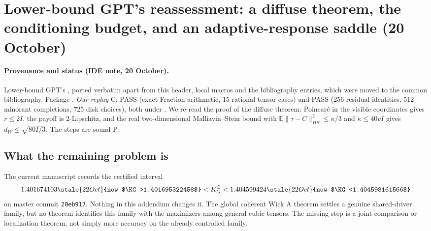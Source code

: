 \section{Lower-bound GPT's reassessment: a diffuse theorem, the conditioning budget, and an adaptive-response saddle (20 October)}\label{ch:gpt-forest}

\paragraph{Provenance and status (IDE note, 20 October).} Lower-bound GPT's , ported verbatim apart from this header, local macros and the bibliography
entries, which were moved to the common bibliography. Package . \emph{Our replay} \st{C}:  PASS
(exact Fraction arithmetic, 15 rational tensor cases) and  PASS (256 residual identities, 512 minorant completions, 725 disk choices), both under
. We re-read the proof of the diffuse theorem: Poincaré in the visible coordinates gives $r\le2I$, the payoff is $2$-Lipschitz, and the real two-dimensional
Malliavin--Stein bound with $\mathbb E\|\tau-C\|_{HS}^2\le\kappa/3$ and $\kappa\le40vI$ gives $d_W\le\sqrt{80I/3}$. The steps are sound \st{P}.
\providecommand{\EE}{\mathbb E}\providecommand{\CC}{\mathbb C}\providecommand{\RR}{\mathbb R}\providecommand{\HH}{\mathcal H}
\providecommand{\Rea}{\operatorname{Re}}\providecommand{\Ima}{\operatorname{Im}}\providecommand{\Var}{\operatorname{Var}}
\providecommand{\tr}{\operatorname{tr}}\providecommand{\phase}{\operatorname{phase}}\providecommand{\eps}{\varepsilon}

\subsection{What the remaining problem is}

The current manuscript records the certified interval
\[
1.401674103\stale{22 Oct}{now $\KG>1.401695322458$}<K_G^{\CC}<1.404599424\stale{22 Oct}{now $\KG<1.404598161566$}
\]
on master commit \texttt{20eb917}. Nothing in this addendum changes it.
The global coherent Wick A theorem settles a genuine shared-driver family,
but no theorem identifies this family with the maximizers among general
cubic tensors. The missing step is a joint comparison or localization
theorem, not simply more accuracy on the already controlled family.

